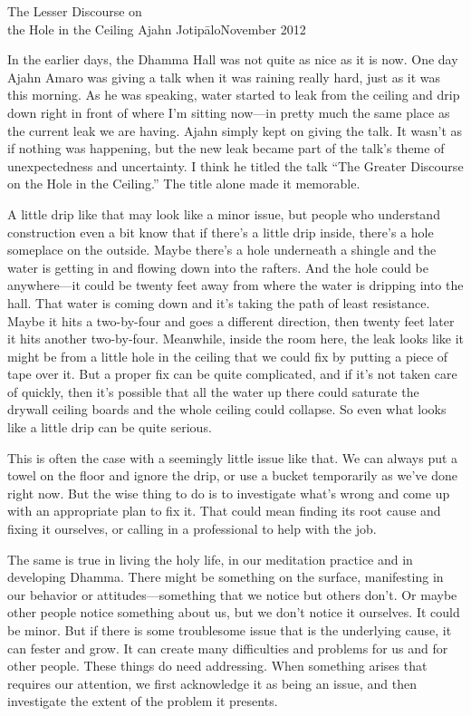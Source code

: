 {The Lesser Discourse on\\the Hole in the Ceiling}
{Ajahn Jotipālo}{November 2012}

In the earlier days, the Dhamma Hall was not quite as nice as it is 
now. One day Ajahn Amaro was giving a talk when it was raining really 
hard, just as it was this morning. As he was speaking, water started to 
leak from the ceiling and drip down right in front of where I'm sitting 
now---in pretty much the same place as the current leak we are having. 
Ajahn simply kept on giving the talk. It wasn't as if nothing was 
happening, but the new leak became part of the talk's theme of 
unexpectedness and uncertainty. I think he titled the talk ``The 
Greater Discourse on the Hole in the Ceiling.'' The title alone made it 
memorable.

A little drip like that may look like a minor issue, but people who 
understand construction even a bit know that if there's a little drip 
inside, there's a hole someplace on the outside. Maybe there's a hole 
underneath a shingle and the water is getting in and flowing down into 
the rafters. And the hole could be anywhere---it could be twenty feet 
away from where the water is dripping into the hall. That water is 
coming down and it's taking the path of least resistance. Maybe it hits 
a two-by-four and goes a different direction, then twenty feet later it 
hits another two-by-four. Meanwhile, inside the room here, the leak 
looks like it might be from a little hole in the ceiling that we could 
fix by putting a piece of tape over it. But a proper fix can be quite 
complicated, and if it's not taken care of quickly, then it's possible 
that all the water up there could saturate the drywall ceiling boards 
and the whole ceiling could collapse. So even what looks like a little 
drip can be quite serious.

This is often the case with a seemingly little issue like that. We can 
always put a towel on the floor and ignore the drip, or use a bucket 
temporarily as we've done right now. But the wise thing to do is to 
investigate what's wrong and come up with an appropriate plan to fix 
it. That could mean finding its root cause and fixing it ourselves, or 
calling in a professional to help with the job.

The same is true in living the holy life, in our meditation practice 
and in developing Dhamma. There might be something on the surface, 
manifesting in our behavior or attitudes---something that we notice but 
others don't. Or maybe other people notice something about us, but we 
don't notice it ourselves. It could be minor. But if there is some 
troublesome issue that is the underlying cause, it can fester and grow. 
It can create many difficulties and problems for us and for other 
people. These things do need addressing. When something arises that 
requires our attention, we first acknowledge it as being an issue, and 
then investigate the extent of the problem it presents.

